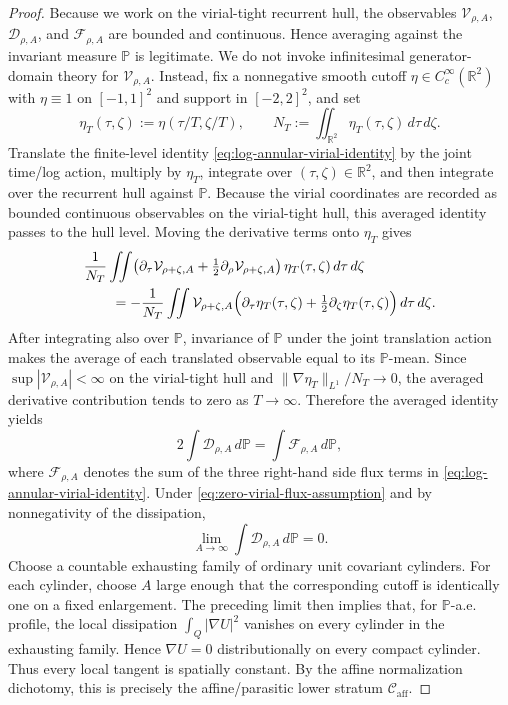 \documentclass[11pt]{amsart}
\numberwithin{equation}{section}
\theoremstyle{plain}
\theoremstyle{definition}
\theoremstyle{remark}
\newcommand{\Caff}{\mathcal C_{\mathrm{aff}}}
\begin{document}
\begin{proof}
Because we work on the virial-tight recurrent hull, the observables
\(\mathcal V_{\rho,A}\), \(\mathcal D_{\rho,A}\), and \(\mathcal F_{\rho,A}\) are
bounded and continuous.  Hence averaging against the invariant measure
\(\mathbb P\) is legitimate.  We do not invoke infinitesimal generator-domain
theory for \(\mathcal V_{\rho,A}\).  Instead, fix a nonnegative smooth cutoff
\(\eta\in C_c^\infty(\mathbb R^2)\) with \(\eta\equiv1\) on \([-1,1]^2\) and
support in \([-2,2]^2\), and set
\[
   \eta_T(\tau,\zeta):=\eta(\tau/T,\zeta/T),
   \qquad
   N_T:=\iint_{\mathbb R^2}\eta_T(\tau,\zeta)\,d\tau\,d\zeta .
\]
Translate the finite-level identity \eqref{eq:log-annular-virial-identity} by
the joint time/log action, multiply by \(\eta_T\), integrate over
\((\tau,\zeta)\in\mathbb R^2\), and then integrate over the recurrent hull
against \(\mathbb P\).  Because the virial coordinates are recorded as bounded
continuous observables on the virial-tight hull, this averaged identity passes
to the hull level.  Moving the derivative terms onto \(\eta_T\) gives
\[
\begin{aligned}
   &\frac1{N_T}\iint
   \bigl(\partial_\tau\mathcal V_{\rho+\zeta,A}
   +\tfrac12\partial_\rho\mathcal V_{\rho+\zeta,A}\bigr)
   \,\eta_T(\tau,\zeta)\,d\tau\,d\zeta \\
   &\qquad =
   -\frac1{N_T}\iint
   \mathcal V_{\rho+\zeta,A}
   \Bigl(\partial_\tau\eta_T(\tau,\zeta)
      +\tfrac12\partial_\zeta\eta_T(\tau,\zeta)\Bigr)
   \,d\tau\,d\zeta .
\end{aligned}
\]
After integrating also over \(\mathbb P\), invariance of \(\mathbb P\) under the
joint translation action makes the average of each translated observable equal
to its \(\mathbb P\)-mean.  Since
\(\sup|\mathcal V_{\rho,A}|<\infty\) on the virial-tight hull and
\(\|\nabla\eta_T\|_{L^1}/N_T\to0\), the averaged derivative contribution tends
to zero as \(T\to\infty\).  Therefore the averaged identity yields
\[
   2\int \mathcal D_{\rho,A}\,d\mathbb P
   =
   \int \mathcal F_{\rho,A}\,d\mathbb P,
\]
where \(\mathcal F_{\rho,A}\) denotes the sum of the three right-hand side flux
terms in \eqref{eq:log-annular-virial-identity}.  Under
\eqref{eq:zero-virial-flux-assumption} and by nonnegativity of the dissipation,
\[
   \lim_{A\to\infty}\int \mathcal D_{\rho,A}\,d\mathbb P=0 .
\]
Choose a countable exhausting family of ordinary unit covariant cylinders.  For
each cylinder, choose \(A\) large enough that the corresponding cutoff is
identically one on a fixed enlargement.  The preceding limit then implies that,
for \(\mathbb P\)-a.e. profile, the local dissipation
\(\int_Q|\nabla U|^2\) vanishes on every cylinder in the exhausting family.
Hence \(\nabla U=0\) distributionally on every compact cylinder.  Thus every
local tangent is spatially constant.  By the affine normalization dichotomy,
this is precisely the affine/parasitic lower stratum \(\Caff\).


\end{proof}
\end{document}
